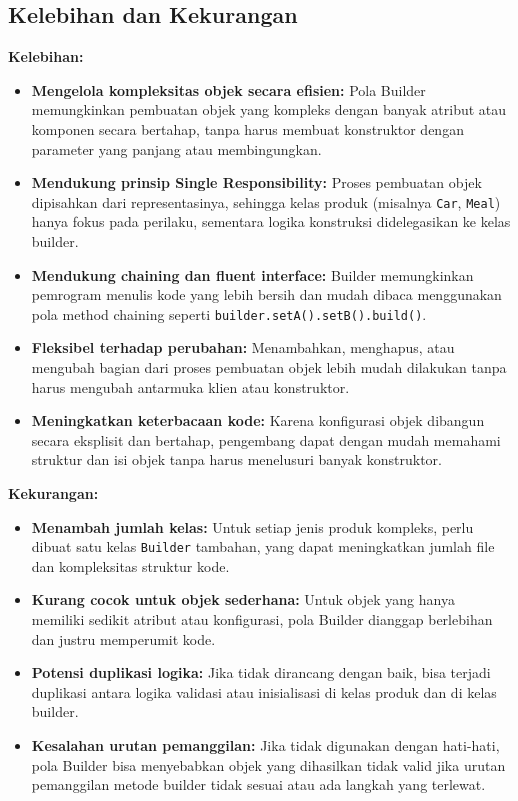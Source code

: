 \subsection{Kelebihan dan Kekurangan}

\textbf{Kelebihan:}
\begin{itemize}
\item \textbf{Mengelola kompleksitas objek secara efisien:} Pola Builder memungkinkan pembuatan objek yang kompleks dengan banyak atribut atau komponen secara bertahap, tanpa harus membuat konstruktor dengan parameter yang panjang atau membingungkan.

\item \textbf{Mendukung prinsip Single Responsibility:} Proses pembuatan objek dipisahkan dari representasinya, sehingga kelas produk (misalnya \texttt{Car}, \texttt{Meal}) hanya fokus pada perilaku, sementara logika konstruksi didelegasikan ke kelas builder.

\item \textbf{Mendukung chaining dan fluent interface:} Builder memungkinkan pemrogram menulis kode yang lebih bersih dan mudah dibaca menggunakan pola method chaining seperti \texttt{build\-er.set\-A().setB().build()}.

\item \textbf{Fleksibel terhadap perubahan:} Menambahkan, menghapus, atau mengubah bagian dari proses pembuatan objek lebih mudah dilakukan tanpa harus mengubah antarmuka klien atau konstruktor.

\item \textbf{Meningkatkan keterbacaan kode:} Karena konfigurasi objek dibangun secara eksplisit dan bertahap, pengembang dapat dengan mudah memahami struktur dan isi objek tanpa harus menelusuri banyak konstruktor.
\end{itemize}

\textbf{Kekurangan:}
\begin{itemize}
\item \textbf{Menambah jumlah kelas:} Untuk setiap jenis produk kompleks, perlu dibuat satu kelas \texttt{Builder} tambahan, yang dapat meningkatkan jumlah file dan kompleksitas struktur kode.

\item \textbf{Kurang cocok untuk objek sederhana:} Untuk objek yang hanya memiliki sedikit atribut atau konfigurasi, pola Builder dianggap berlebihan dan justru memperumit kode.

\item \textbf{Potensi duplikasi logika:} Jika tidak dirancang dengan baik, bisa terjadi duplikasi antara logika validasi atau inisialisasi di kelas produk dan di kelas builder.

\item \textbf{Kesalahan urutan pemanggilan:} Jika tidak digunakan dengan hati-hati, pola Builder bisa menyebabkan objek yang dihasilkan tidak valid jika urutan pemanggilan metode builder tidak sesuai atau ada langkah yang terlewat.
\end{itemize}



